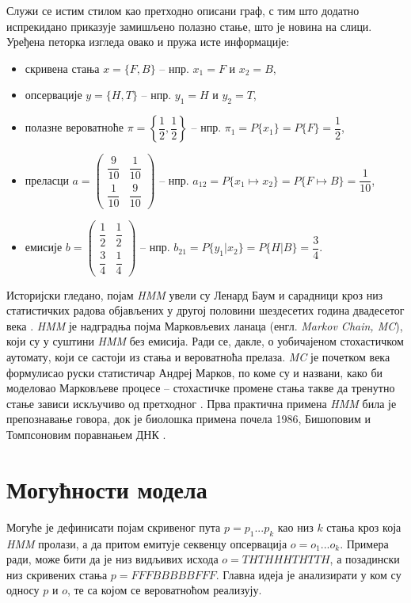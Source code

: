 \documentclass[12pt,oneside]{memoir}
\begin{document}
\begin{CJK}{UTF8}{ipxm}
Служи се истим стилом као претходно описани граф, с тим што додатно испрекидано приказује замишљено полазно стање, што је новина на слици. Уређена петорка изгледа овако и пружа исте информације:
\begin{itemize}
  \item скривена стања $x = \{F, B\}$ -- нпр. $x_1 = F$ и $x_2 = B$,
  \item опсервације $y = \{H, T\}$ -- нпр. $y_1 = H$ и $y_2 = T$,
  \item полазне вероватноће $\pi = \left\{\dfrac{1}{2}, \dfrac{1}{2}\right\}$ -- нпр. $\pi_1 = P\{x_1\} = P\{F\} = \dfrac{1}{2}$,
  \item преласци $a = \left(\begin{matrix}\dfrac{9}{10} & \dfrac{1}{10}\\[8pt] \dfrac{1}{10} & \dfrac{9}{10}\end{matrix}\right)$ -- нпр. $a_{12} = P\{x_1 \mapsto x_2\} = P\{F \mapsto B\} = \dfrac{1}{10}$,
  \item емисије $b = \left(\begin{matrix}\dfrac{1}{2} & \dfrac{1}{2}\\[8pt] \dfrac{3}{4} & \dfrac{1}{4}\end{matrix}\right)$ -- нпр. $b_{21} = P\{y_1 | x_2\} = P\{H | B\} = \dfrac{3}{4}$.
\end{itemize}

Историјски гледано, појам \textit{HMM} увели су Ленард Баум и сарадници кроз низ статистичких радова објављених у другој половини шездесетих година двадесетог века \cite{baum1966}. \textit{HMM} је надградња појма Марковљевих ланаца (енгл. \textit{Markov Chain, MC}), који су у суштини \textit{HMM} без емисија. Ради се, дакле, о уобичајеном стохастичком аутомату, који се састоји из стања и вероватноћа прелаза. \textit{MC} је почетком века формулисао руски статистичар Андреј Марков, по коме су и названи, како би моделовао Марковљеве процесе -- стохастичке промене стања такве да тренутно стање зависи искључиво од претходног \cite{markov1906}. Прва практична примена \textit{HMM} била је препознавање говора, док је биолошка примена почела 1986, Бишоповим и Томпсоновим поравнањем ДНК \cite{bishop1986}.

\section{Могућности модела}
Могуће је дефинисати појам скривеног пута $p = p_1...p_k$ као низ $k$ стања кроз која \textit{HMM} пролази, а да притом емитује секвенцу опсервација $o = o_1...o_k$. Примера ради, може бити да је низ видљивих исхода $o = THTHHHTHTTH$, а позадински низ скривених стања $p = FFFBBBBBFFF$. Главна идеја је анализирати у ком су односу $p$ и $o$, те са којом се вероватноћом реализују.


\end{CJK}
\end{document}
